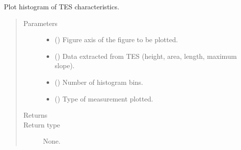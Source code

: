 \documentclass[letterpaper,10pt,english]{sphinxmanual}
\begin{document}

\begin{fulllineitems}
\label{\detokenize{tes:tes.calibration.plot_histogram}}
\sphinxAtStartPar
Plot histogram of TES characteristics.
\begin{quote}\begin{description}
\item[{Parameters}] \leavevmode\begin{itemize}
\item {} 
\sphinxAtStartPar
{} () \textendash{} Figure axis of the figure to be plotted.

\item {} 
\sphinxAtStartPar
{} () \textendash{} Data extracted from TES (height, area, length, maximum slope).

\item {} 
\sphinxAtStartPar
{} () \textendash{} Number of histogram bins.

\item {} 
\sphinxAtStartPar
{} () \textendash{} Type of measurement plotted.

\end{itemize}

\item[{Returns}] \leavevmode
\sphinxAtStartPar


\item[{Return type}] \leavevmode
\sphinxAtStartPar
None.

\end{description}\end{quote}

\end{fulllineitems}

\end{document}
